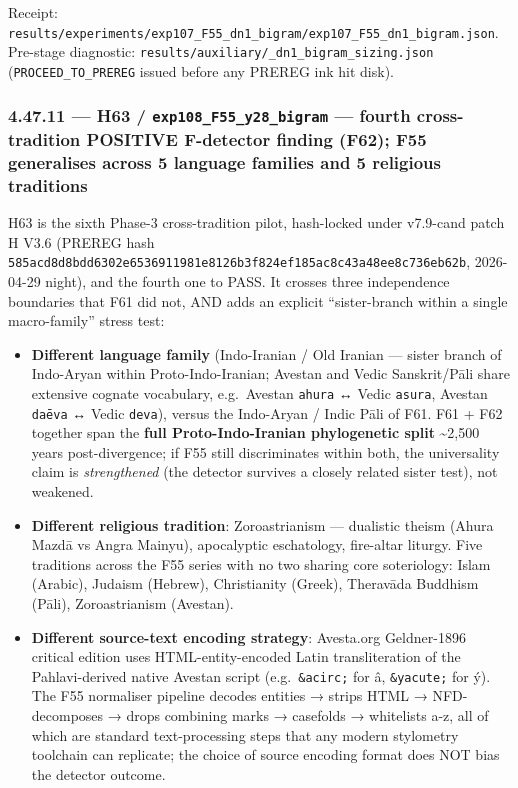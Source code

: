 \documentclass[
]{article}
\providecommand{\tightlist}{%
  \setlength{\itemsep}{0pt}\setlength{\parskip}{0pt}}
\begin{document}
Receipt:
\texttt{results/experiments/exp107\_F55\_dn1\_bigram/exp107\_F55\_dn1\_bigram.json}.
Pre-stage diagnostic:
\texttt{results/auxiliary/\_dn1\_bigram\_sizing.json}
(\texttt{PROCEED\_TO\_PREREG} issued before any PREREG ink hit disk).

\subsubsection{\texorpdfstring{4.47.11 --- H63 /
\texttt{exp108\_F55\_y28\_bigram} --- fourth cross-tradition POSITIVE
F-detector finding (F62); F55 generalises across 5 language families and
5 religious
traditions}{4.47.11 --- H63 / exp108\_F55\_y28\_bigram --- fourth cross-tradition POSITIVE F-detector finding (F62); F55 generalises across 5 language families and 5 religious traditions}}\label{h63-exp108_f55_y28_bigram-fourth-cross-tradition-positive-f-detector-finding-f62-f55-generalises-across-5-language-families-and-5-religious-traditions}

H63 is the sixth Phase-3 cross-tradition pilot, hash-locked under
v7.9-cand patch H V3.6 (PREREG hash
\texttt{585acd8d8bdd6302e6536911981e8126b3f824ef185ac8c43a48ee8c736eb62b},
2026-04-29 night), and the fourth one to PASS. It crosses three
independence boundaries that F61 did not, AND adds an explicit
``sister-branch within a single macro-family'' stress test:

\begin{itemize}
\tightlist
\item
  \textbf{Different language family} (Indo-Iranian / Old Iranian ---
  sister branch of Indo-Aryan within Proto-Indo-Iranian; Avestan and
  Vedic Sanskrit/Pāli share extensive cognate vocabulary, e.g.~Avestan
  \texttt{ahura} ↔ Vedic \texttt{asura}, Avestan \texttt{daēva} ↔ Vedic
  \texttt{deva}), versus the Indo-Aryan / Indic Pāli of F61. F61 + F62
  together span the \textbf{full Proto-Indo-Iranian phylogenetic split}
  \textasciitilde2,500 years post-divergence; if F55 still discriminates
  within both, the universality claim is \emph{strengthened} (the
  detector survives a closely related sister test), not weakened.
\item
  \textbf{Different religious tradition}: Zoroastrianism --- dualistic
  theism (Ahura Mazdā vs Angra Mainyu), apocalyptic eschatology,
  fire-altar liturgy. Five traditions across the F55 series with no two
  sharing core soteriology: Islam (Arabic), Judaism (Hebrew),
  Christianity (Greek), Theravāda Buddhism (Pāli), Zoroastrianism
  (Avestan).
\item
  \textbf{Different source-text encoding strategy}: Avesta.org
  Geldner-1896 critical edition uses HTML-entity-encoded Latin
  transliteration of the Pahlavi-derived native Avestan script
  (e.g.~\texttt{\&acirc;} for â, \texttt{\&yacute;} for ý). The F55
  normaliser pipeline decodes entities → strips HTML → NFD-decomposes →
  drops combining marks → casefolds → whitelists a-z, all of which are
  standard text-processing steps that any modern stylometry toolchain
  can replicate; the choice of source encoding format does NOT bias the
  detector outcome.
\end{itemize}
\end{document}
